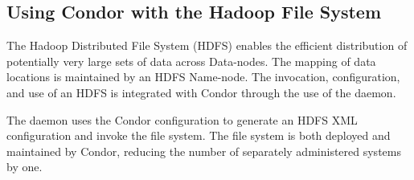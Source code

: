 \subsection{\label{sec:Condor-HDFS}Using Condor with the Hadoop File System}

The Hadoop Distributed File System (HDFS) enables the efficient distribution
of potentially very large sets of data across Data-nodes.
The mapping of data locations is maintained by an HDFS Name-node.
The invocation, configuration, and use of an HDFS is integrated with Condor
through the use of the  daemon.

The  daemon uses the Condor configuration to generate
an HDFS XML configuration and invoke the file system. 
The file system is both deployed and maintained by Condor, 
reducing the number of separately administered systems by one.

\MoreTodo

